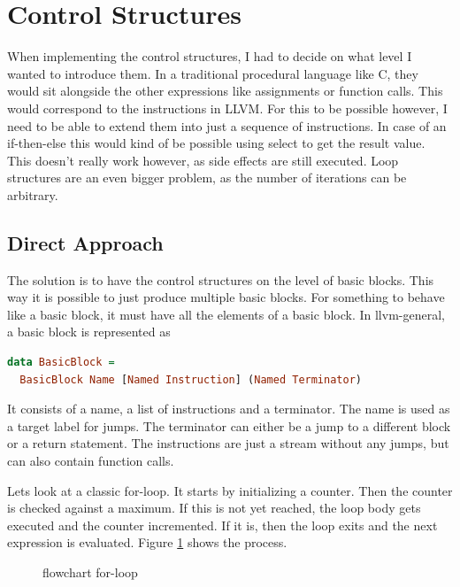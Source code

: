 \documentclass[a4paper,bibliography=totocnumbered,parskip,headsepline]{scrbook}
\begin{document}
\section{Control Structures}
When implementing the control structures, I had to decide on what level I wanted to introduce them.
In a traditional procedural language like C, they would sit alongside the other expressions like assignments or function calls.
This would correspond to the instructions in LLVM.
For this to be possible however, I need to be able to extend them into just a sequence of instructions.
In case of an if-then-else this would kind of be possible using select to get the result value.
This doesn't really work however, as side effects are still executed.
Loop structures are an even bigger problem, as the number of iterations can be arbitrary.

\subsection{Direct Approach}
The solution is to have the control structures on the level of basic blocks.
This way it is possible to just produce multiple basic blocks.
For something to behave like a basic block, it must have all the elements of a basic block.
In llvm-general, a basic block is represented as

\begin{lstlisting}[language=haskell]
data BasicBlock =
  BasicBlock Name [Named Instruction] (Named Terminator)
\end{lstlisting}

It consists of a name, a list of instructions and a terminator.
The name is used as a target label for jumps.
The terminator can either be a jump to a different block or a return statement.
The instructions are just a stream without any jumps, but can also contain function calls.

Lets look at a classic for-loop.
It starts by initializing a counter.
Then the counter is checked against a maximum.
If this is not yet reached, the loop body gets executed and the counter incremented.
If it is, then the loop exits and the next expression is evaluated.
Figure \ref{fig:forchart} shows the process.

\begin{figure}
\begin{center}
\end{center}
\caption{flowchart for-loop}
\label{fig:forchart}
\end{figure}
\end{document}
